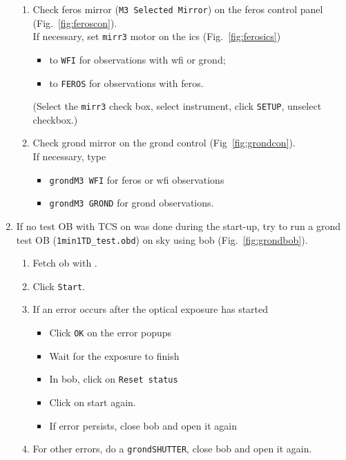 \documentclass[11pt,fleqn]{book} %
\begin{document}
\begin{enumerate}
\begin{enumerate}
        \item Check \gls{feros} mirror (\texttt{M3 Selected Mirror}) on the \gls{feros} control panel (Fig.~\ref{fig:feroscon}).\\
              If necessary, set \texttt{mirr3} motor on the \gls{ics} (Fig.~\ref{fig:ferosics})
              \begin{itemize}
                \item to \texttt{WFI} for observations with \gls{wfi} or \gls{grond};
                \item to \texttt{FEROS} for observations with \gls{feros}.
              \end{itemize}
              (Select the \texttt{mirr3} check box, select instrument, click \texttt{SETUP}, unselect checkbox.)
        \item Check \gls{grond} mirror on the \gls{grond} control (Fig~\ref{fig:grondcon}).\\
              If necessary, type 
              \begin{itemize}
                  \item \texttt{grondM3 WFI} for \gls{feros} or \gls{wfi} observations
                  \item \texttt{grondM3 GROND} for \gls{grond} observations.
              \end{itemize}
     \end{enumerate}
  \item If no test OB with TCS on was done during the start-up, try to run a \gls{grond} test OB (\texttt{1min1TD\_test.obd}) on sky using \gls{bob} (Fig.~\ref{fig:grondbob}).
     \begin{enumerate}
       \item Fetch \gls{ob} with \fetchob.
       \item Click \texttt{Start}.      
       \item If an error occurs after the optical exposure has started
             \begin{itemize}
                \item Click \texttt{OK} on the error popups
                \item Wait for the exposure to finish
                \item In \gls{bob}, click on \texttt{Reset status}
                \item Click on start again.
                \item If error persists, close \gls{bob} and open it again
             \end{itemize} 
       \item For other errors, do a \texttt{grondSHUTTER}, close bob and open it again.
     \end{enumerate}
\end{enumerate}
\end{document}
